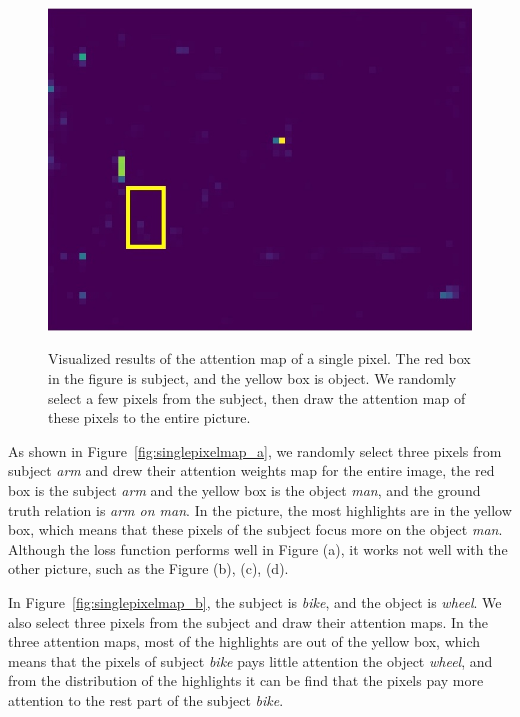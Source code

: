 \begin{figure}[h!]
{\begin{minipage}[t]{3.5cm}
		\end{minipage}
		\begin{minipage}[t]{3.5cm}
			\centering
			\includegraphics[width=0.9\linewidth]{figures/pixel/map5_3}
		\end{minipage}
		\label{fig:singlepixelmap_d}}
	
	\caption[Visualized results of the attention map of a single pixel ]{Visualized results of the attention map of a single pixel. The red box in the figure is subject, and the yellow box is object. We randomly select a few pixels from the subject, then draw the attention map of these pixels to the entire picture. }
	\label{fig:singlepixelmap}
\end{figure}

As shown in Figure~\ref{fig:singlepixelmap_a}, we randomly select three pixels from subject \textit{arm} and drew their attention weights map for the entire image, the red box is the subject \textit{arm} and the yellow box is the object\textit{ man}, and the ground truth relation is \textit{arm on man}. In the picture, the most highlights are in the yellow box, which means that these pixels of the subject focus more on the object \textit{man}. Although the loss function performs well in Figure (a), it works not well with the other picture, such as the Figure (b), (c), (d).

In Figure~\ref{fig:singlepixelmap_b}, the subject is \textit{bike}, and the object is \textit{wheel}. We also select three pixels from the subject and draw their attention maps. In the three attention maps, most of the highlights are out of the yellow box, which means that the pixels of subject \textit{bike} pays little attention the object \textit{wheel}, and from the distribution of the highlights it can be find that the pixels pay more attention to the rest part of the subject \textit{bike}.

